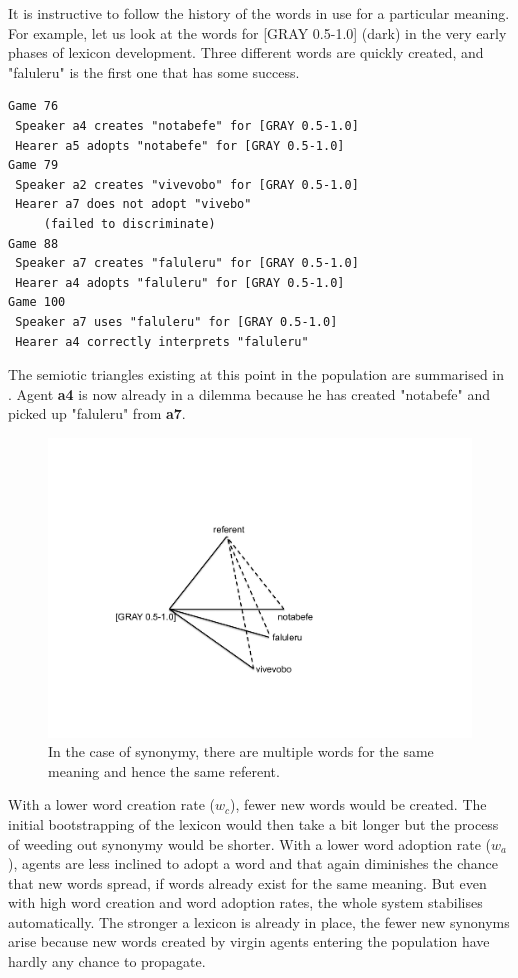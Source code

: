It is instructive to follow the history of the words 
in use for a particular meaning. For 
example, let us look at the words for [GRAY 0.5-1.0] 
(dark) in the very early phases of lexicon development.
Three different words are quickly created, and 
"faluleru" is the first one that has some success. 
\begin{verbatim}
Game 76
 Speaker a4 creates "notabefe" for [GRAY 0.5-1.0]
 Hearer a5 adopts "notabefe" for [GRAY 0.5-1.0]
Game 79 
 Speaker a2 creates "vivevobo" for [GRAY 0.5-1.0]
 Hearer a7 does not adopt "vivebo" 
     (failed to discriminate)
Game 88 
 Speaker a7 creates "faluleru" for [GRAY 0.5-1.0]
 Hearer a4 adopts "faluleru" for [GRAY 0.5-1.0]
Game 100 
 Speaker a7 uses "faluleru" for [GRAY 0.5-1.0]
 Hearer a4 correctly interprets "faluleru"
\end{verbatim}
The semiotic triangles existing at this point in the population are 
summarised in . 
Agent {\bf a4} is now already in a dilemma because he has created
"notabefe" and picked up "faluleru" from {\bf a7}. 
\begin{figure}[htbp]
  \centerline{\includegraphics[width=.50\textwidth]{chap6/figs/triangle6}}
\caption{\label{triangle6} In the case of synonymy, 
there are multiple words for the same meaning and hence the 
same referent.}
\end{figure}

With a lower word creation rate ($w_{c}$), 
fewer new words would be created. The initial bootstrapping
of the lexicon would then take a bit longer but the 
process of weeding out synonymy would be shorter. 
With a lower word adoption rate ($w_{a}$), agents are
less inclined to adopt a word and that again diminishes
the chance that new words spread, if words already 
exist for the same meaning. But even with high word creation
and word adoption rates, the whole system stabilises automatically. 
The stronger a lexicon is already in place, the fewer
new synonyms arise because new words
created by virgin agents entering the population have hardly 
any chance to propagate. 


